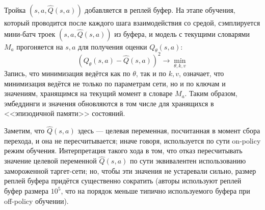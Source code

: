 Тройка $(s, a, \hat{Q}(s, a))$ добавляется в реплей буфер. На этапе обучения, который проводится после каждого шага взаимодействия со средой, сэмплируется мини-батч троек $(s, a, \hat{Q}(s, a))$ из буфера, и модель с текущими словарями $M_a$ прогоняется на $s, a$ для получения оценки $Q_{\theta}(s, a)$:
\begin{equation*}
\left( Q_{\theta}(s, a) - \hat{Q}(s, a)\right)^2 \to \min_{\theta, k, v}
\end{equation*}
Запись, что минимизация ведётся как по $\theta$, так и по $k, v$, означает, что минимизация ведётся не только по параметрам сети, но и по ключам и значениям, хранящимся на текущий момент в словаре $M_a$. Таким образом, эмбеддинги и значения обновляются в том числе для хранящихся в <<эпизодичной памяти>> состояний.

Заметим, что $\hat{Q}(s, a)$ здесь --- целевая переменная, посчитанная в момент сбора перехода, и она не пересчитывается; иначе говоря, используется по сути on-policy режим обучения. Интерпретация такого хода в том, что отказ пересчитывать значение целевой переменной $\hat{Q}(s, a)$ по сути эквивалентен использованию замороженной таргет-сети; но, чтобы эти значения не устаревали сильно, размер реплей буфера придётся существенно сократить (авторы используют реплей буфер размера $10^5$, что на порядок меньше типично используемого буфера при off-policy обучении).